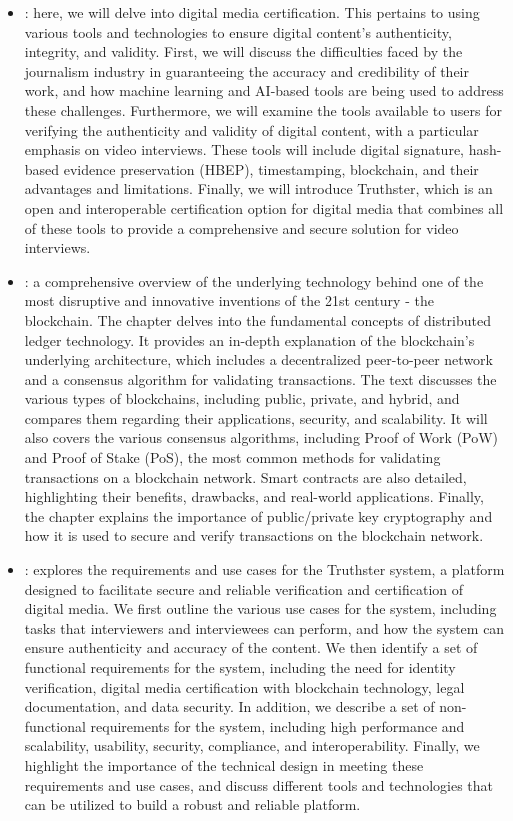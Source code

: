 \documentclass[target=mst,aauheader=]{thud}
\begin{document}
\begin{itemize}

    \item \textbf{}: here, we will delve into digital media certification. This pertains to using various tools and technologies to ensure digital content's authenticity, integrity, and validity. First, we will discuss the difficulties faced by the journalism industry in guaranteeing the accuracy and credibility of their work, and how machine learning and AI-based tools are being used to address these challenges. Furthermore, we will examine the tools available to users for verifying the authenticity and validity of digital content, with a particular emphasis on video interviews. These tools will include digital signature, hash-based evidence preservation (HBEP), timestamping, blockchain, and their advantages and limitations. Finally, we will introduce Truthster, which is an open and interoperable certification option for digital media that combines all of these tools to provide a comprehensive and secure solution for video interviews.
    \item \textbf{}: a comprehensive overview of the underlying technology behind one of the most disruptive and innovative inventions of the 21st century - the blockchain. The chapter delves into the fundamental concepts of distributed ledger technology. It provides an in-depth explanation of the blockchain's underlying architecture, which includes a decentralized peer-to-peer network and a consensus algorithm for validating transactions. The text discusses the various types of blockchains, including public, private, and hybrid, and compares them regarding their applications, security, and scalability. It will also covers the various consensus algorithms, including Proof of Work (PoW) and Proof of Stake (PoS), the most common methods for validating transactions on a blockchain network. Smart contracts are also detailed, highlighting their benefits, drawbacks, and real-world applications. Finally, the chapter explains the importance of public/private key cryptography and how it is used to secure and verify transactions on the blockchain network.
    \item \textbf{}: explores the requirements and use cases for the Truthster system, a platform designed to facilitate secure and reliable verification and certification of digital media. We first outline the various use cases for the system, including tasks that interviewers and interviewees can perform, and how the system can ensure authenticity and accuracy of the content. We then identify a set of functional requirements for the system, including the need for identity verification, digital media certification with blockchain technology, legal documentation, and data security. In addition, we describe a set of non-functional requirements for the system, including high performance and scalability, usability, security, compliance, and interoperability. Finally, we highlight the importance of the technical design in meeting these requirements and use cases, and discuss different tools and technologies that can be utilized to build a robust and reliable platform.

\end{itemize}
\end{document}
